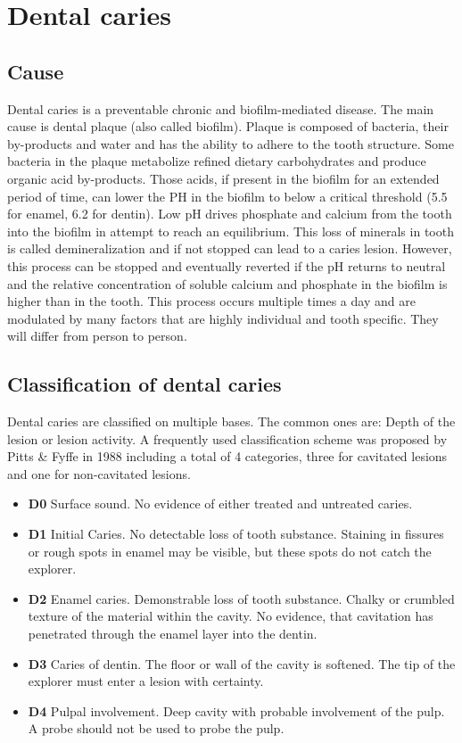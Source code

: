 \section{Dental caries}

\subsection{Cause}
Dental caries is a preventable chronic and biofilm-mediated disease. The main cause is dental plaque (also called biofilm). Plaque is composed of bacteria, their by-products and water and has the ability to adhere to the tooth structure. Some bacteria in the plaque metabolize refined dietary carbohydrates and produce organic acid by-products. Those acids, if present in the biofilm for an extended period of time, can lower the PH in the biofilm to below a critical threshold (5.5 for enamel, 6.2 for dentin). Low pH drives phosphate and calcium from the tooth into the biofilm in attempt to reach an equilibrium. This loss of minerals in tooth is called demineralization and if not stopped can lead to a caries lesion. However, this process can be stopped and eventually reverted if the pH returns to neutral and the relative concentration of soluble calcium and phosphate in the biofilm is higher than in the tooth. This process occurs multiple times a day and are modulated by many factors that are highly individual and tooth specific. They will differ from person to person.


\subsection{Classification of dental caries}
Dental caries are classified on multiple bases. The common ones are: Depth of the lesion or lesion activity. \newline
A frequently used classification scheme was proposed by Pitts \& Fyffe in 1988 including a total of 4 categories, three for cavitated lesions and one for non-cavitated lesions.
\begin{itemize}
    \item \textbf{D0} Surface sound. No evidence of either treated and untreated caries.
    \item \textbf{D1} Initial Caries. No detectable loss of tooth substance. Staining in fissures or rough spots in enamel may be visible, but these spots do not catch the explorer.
    \item \textbf{D2} Enamel caries. Demonstrable loss of tooth substance. Chalky or crumbled texture of the material within the cavity. No evidence, that cavitation has penetrated through the enamel layer into the dentin.
    \item \textbf{D3} Caries of dentin. The floor or wall of the cavity is softened. The tip of the explorer must enter a lesion with certainty.
    \item \textbf{D4} Pulpal involvement. Deep cavity with probable involvement of the pulp. A probe should not be used to probe the pulp.
\end{itemize}

